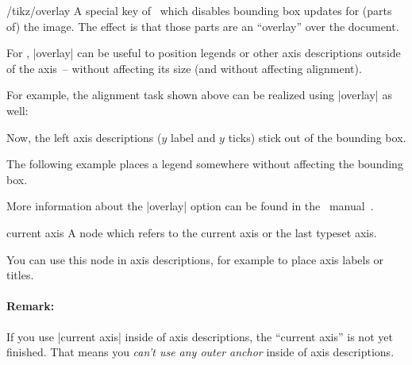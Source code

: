 \begin{key}{/tikz/overlay}
	A special key of \PGF\ which disables bounding box updates for (parts of) the image. The effect is that those parts are an ``overlay'' over the document.

	For \PGFPlots, |overlay| can be useful to position legends or other axis descriptions outside of the axis~-- without affecting its size (and without affecting alignment).

For example, the alignment task shown above can be realized using |overlay| as well:
\begin{codeexample}[]
%
\end{codeexample}
\noindent Now, the left axis descriptions ($y$ label and $y$ ticks) stick out of the bounding box.
	
The following example places a legend somewhere without affecting the bounding box.
\begin{codeexample}[]
\end{codeexample}

	More information about the |overlay| option can be found in the \PGF\ manual~\cite{tikz}.
\end{key}

\begin{predefinednode}{current axis}
	A node which refers to the current axis or the last typeset axis.

	You can use this node in axis descriptions, for example to place axis labels or titles.

	\paragraph{Remark:} If you use |current axis| inside of axis descriptions, the ``current axis'' is not yet finished. That means you \emph{can't use any outer anchor} inside of axis descriptions.
\end{predefinednode}

